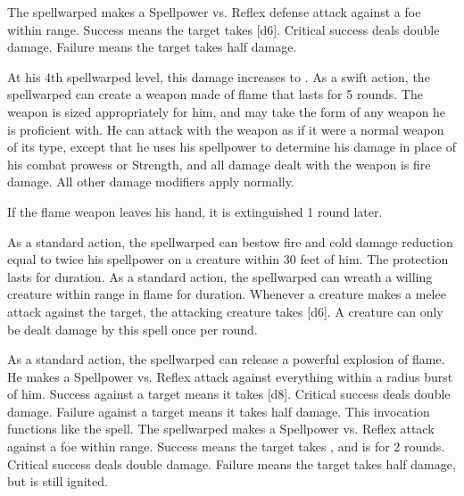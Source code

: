             The spellwarped makes a Spellpower vs. Reflex defense attack against a foe within \rngmed range.
            Success means the target takes [d6].
            Critical success deals double damage.
            Failure means the target takes half damage.
            \par At his 4th spellwarped level, this damage increases to .
            As a swift action, the spellwarped can create a weapon made of flame that lasts for 5 rounds.
            The weapon is sized appropriately for him, and may take the form of any weapon he is proficient with.
            He can attack with the weapon as if it were a normal weapon of its type, except that he uses his spellpower to determine his damage in place of his combat prowess or Strength, and all damage dealt with the weapon is fire damage.
            All other damage modifiers apply normally.
            \par If the flame weapon leaves his hand, it is extinguished 1 round later.

            As a standard action, the spellwarped can bestow fire and cold damage reduction equal to twice his spellpower on a creature within 30 feet of him.
            The protection lasts for \durshort duration.
            As a standard action, the spellwarped can wreath a willing creature within \rngclose range in flame for \durshort duration.
            Whenever a creature makes a melee attack against the target, the attacking creature takes [d6].
            A creature can only be dealt damage by this spell once per round.

            As a standard action, the spellwarped can release a powerful explosion of flame.
            He makes a Spellpower vs. Reflex attack against everything within a \areamed radius burst of him.
            Success against a target means it takes [d8].
            Critical success deals double damage.
            Failure against a target means it takes half damage.
            This invocation functions like the  spell.
            The spellwarped makes a Spellpower vs. Reflex attack against a foe within \rngclose range.
            Success means the target takes , and is \ignited for 2 rounds.
            Critical success deals double damage.
            Failure means the target takes half damage, but is still ignited.

